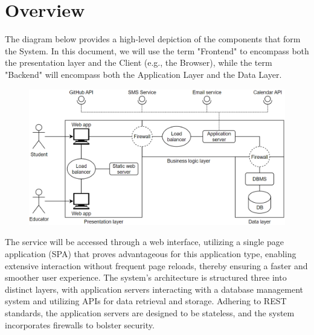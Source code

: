 \documentclass[12pt, a4paper]{report}
\begin{document}
    \section{Overview}
    The diagram below provides a high-level depiction of the components that form the System. 
    In this document, we will use the term "Frontend" to encompass both the presentation layer and the Client (e.g., the Browser), while the term "Backend" will encompass both the Application Layer and the Data Layer.
    \begin{figure}[H]
        \centering
        \includegraphics[width=0.9\linewidth]{images/high_level_architecture.png}
    \end{figure}
    The service will be accessed through a web interface, utilizing a single page application (SPA) that proves advantageous for this application type, enabling extensive interaction without frequent page reloads, thereby ensuring a faster and smoother user experience. 
    The system's architecture is structured three into distinct layers, with application servers interacting with a database management system and utilizing APIs for data retrieval and storage. 
    Adhering to REST standards, the application servers are designed to be stateless, and the system incorporates firewalls to bolster security.
    
\end{document}
